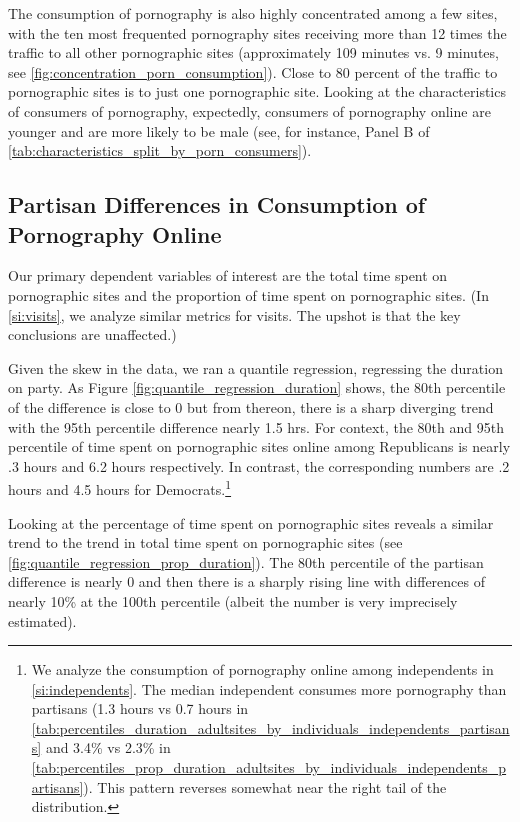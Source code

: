 \documentclass[12pt, letterpaper]{article}
\begin{document}
The consumption of pornography is also highly concentrated among a few sites, with the ten most frequented pornography sites receiving more than 12 times the traffic to all other pornographic sites (approximately 109 minutes vs. 9 minutes, see \cref{fig:concentration_porn_consumption}). Close to 80 percent of the traffic to pornographic sites is to just one pornographic site. Looking at the characteristics of consumers of pornography, expectedly, consumers of pornography online are younger and are more likely to be male (see, for instance, Panel B of \cref{tab:characteristics_split_by_porn_consumers}).

\subsection*{Partisan Differences in Consumption of Pornography Online}

Our primary dependent variables of interest are the total time spent on pornographic sites and the proportion of time spent on pornographic sites. (In \ref{si:visits}, we analyze similar metrics for visits. The upshot is that the key conclusions are unaffected.)

Given the skew in the data, we ran a quantile regression, regressing the duration on party. As Figure \ref{fig:quantile_regression_duration} shows, the 80th percentile of the difference is close to 0 but from thereon, there is a sharp diverging trend with the 95th percentile difference nearly 1.5 hrs. For context, the 80th and 95th percentile of time spent on pornographic sites online among Republicans is nearly .3 hours and 6.2 hours respectively. In contrast, the corresponding numbers are .2 hours and 4.5 hours for Democrats.\footnote{

	We analyze the consumption of pornography online among independents in \cref{si:independents}. The median independent consumes more pornography than partisans (1.3 hours vs 0.7 hours in \cref{tab:percentiles_duration_adultsites_by_individuals_independents_partisans} and 3.4\% vs 2.3\% in \cref{tab:percentiles_prop_duration_adultsites_by_individuals_independents_partisans}). This pattern reverses somewhat near the right tail of the distribution.}

Looking at the percentage of time spent on pornographic sites reveals a similar trend to the trend in total time spent on pornographic sites (see \ref{fig:quantile_regression_prop_duration}). The 80th percentile of the partisan difference is nearly 0 and then there is a sharply rising line with differences of nearly 10\% at the 100th percentile (albeit the number is very imprecisely estimated).
\end{document}
